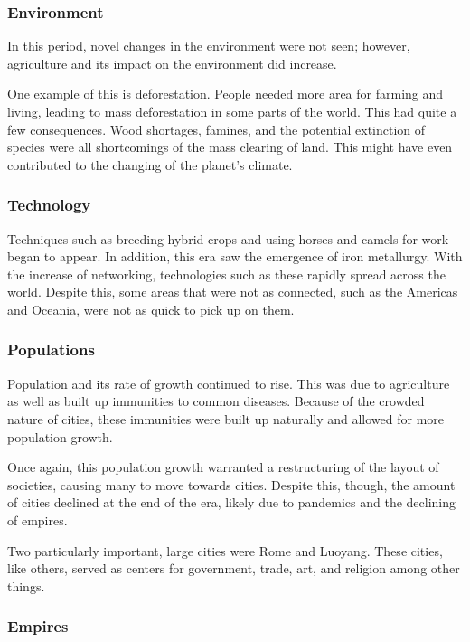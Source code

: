 \documentclass[11pt]{article}
\begin{document}
\subsubsection{Environment}
\label{sec:org4b9d33b}

In this period, novel changes in the environment were not seen; however, agriculture and its impact on the environment did increase.

One example of this is deforestation. People needed more area for farming and living, leading to mass deforestation in some parts of the world. This had quite a few consequences. Wood shortages, famines, and the potential extinction of species were all shortcomings of the mass clearing of land. This might have even contributed to the changing of the planet's climate.

\subsubsection{Technology}
\label{sec:org4279c87}

Techniques such as breeding hybrid crops and using horses and camels for work began to appear. In addition, this era saw the emergence of iron metallurgy. With the increase of networking, technologies such as these rapidly spread across the world. Despite this, some areas that were not as connected, such as the Americas and Oceania, were not as quick to pick up on them.

\subsubsection{Populations}
\label{sec:org78b9c08}

Population and its rate of growth continued to rise. This was due to agriculture as well as built up immunities to common diseases. Because of the crowded nature of cities, these immunities were built up naturally and allowed for more population growth.

Once again, this population growth warranted a restructuring of the layout of societies, causing many to move towards cities. Despite this, though, the amount of cities declined at the end of the era, likely due to pandemics and the declining of empires.

Two particularly important, large cities were Rome and Luoyang. These cities, like others, served as centers for government, trade, art, and religion among other things.

\subsubsection{Empires}
\label{sec:orgdb996c7}
\end{document}
